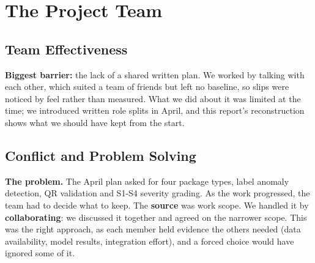 \clearpage
\section{The Project Team}
\subsection{Team Effectiveness}

\textbf{Biggest barrier:} the lack of a shared written plan. We worked by talking with each other, which suited a team of friends but left no baseline, so slips were noticed by feel rather than measured. What we did about it was limited at the time; we introduced written role splits in April, and this report's reconstruction shows what we should have kept from the start.

\subsection{Conflict and Problem Solving}
\textbf{The problem.} The April plan asked for four package types, label anomaly detection, QR validation and S1-S4 severity grading. As the work progressed, the team had to decide what to keep. The \textbf{source} was work scope. We handled it by \textbf{collaborating}: we discussed it together and agreed on the narrower scope. This was the right approach, as each member held evidence the others needed (data availability, model results, integration effort), and a forced choice would have ignored some of it.

